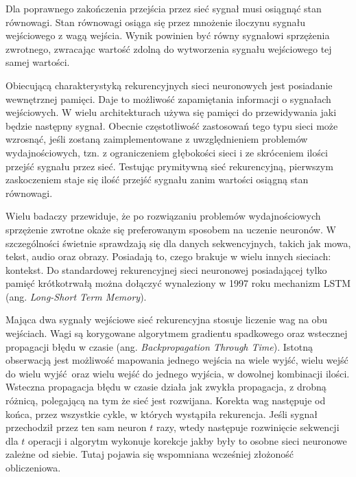 \documentclass[12pt,a4paper,twoside,titlepage,openright]{book}
\begin{document}
\begin{itemize}
Dla poprawnego zakończenia przejścia przez sieć sygnał musi osiągnąć stan równowagi. Stan równowagi osiąga się przez mnożenie iloczynu sygnału wejściowego z wagą wejścia. Wynik powinien być równy sygnałowi sprzężenia zwrotnego, zwracając wartość zdolną do wytworzenia sygnału wejściowego tej samej wartości.

Obiecującą charakterystyką rekurencyjnych sieci neuronowych jest posiadanie wewnętrznej pamięci. Daje to możliwość zapamiętania informacji o sygnałach wejściowych. W wielu architekturach używa się pamięci do przewidywania jaki będzie następny sygnał. Obecnie częstotliwość zastosowań tego typu sieci może wzrosnąć, jeśli zostaną zaimplementowane z uwzględnieniem problemów wydajnościowych, tzn. z ograniczeniem głębokości sieci i ze skróceniem ilości przejść sygnału przez sieć. Testując prymitywną sieć rekurencyjną, pierwszym zaskoczeniem staje się ilość przejść sygnału zanim wartości osiągną stan równowagi.

Wielu badaczy \cite{siteRNN} przewiduje,  że po rozwiązaniu problemów wydajnościowych sprzężenie zwrotne okaże się preferowanym sposobem na uczenie neuronów. W szczególności świetnie sprawdzają się dla danych sekwencyjnych, takich jak mowa, tekst, audio oraz obrazy. Posiadają to, czego brakuje w wielu innych sieciach: kontekst. Do standardowej rekurencyjnej sieci neuronowej posiadającej tylko pamięć krótkotrwałą można dołączyć wynaleziony w 1997 roku mechanizm LSTM (ang. \textit{Long-Short Term Memory}). 

Mająca dwa sygnały wejściowe sieć rekurencyjna stosuje liczenie wag na obu wejściach. Wagi są korygowane algorytmem gradientu spadkowego oraz wstecznej propagacji błędu w czasie (ang. \textit{Backpropagation Through Time}). Istotną obserwacją jest możliwość mapowania jednego wejścia na wiele wyjść, wielu wejść do wielu wyjść oraz wielu wejść do jednego wyjścia, w dowolnej kombinacji ilości. Wsteczna propagacja błędu w czasie działa jak zwykła propagacja, z drobną różnicą, polegającą na tym że sieć jest rozwijana. Korekta wag następuje od końca, przez wszystkie cykle, w których wystąpiła rekurencja. Jeśli sygnał przechodził przez ten sam neuron $t$ razy, wtedy następuje rozwinięcie sekwencji dla $t$ operacji i algorytm wykonuje korekcje jakby były to osobne sieci neuronowe zależne od siebie. Tutaj pojawia się wspomniana wcześniej złożoność obliczeniowa.


\end{itemize}
\end{document}
